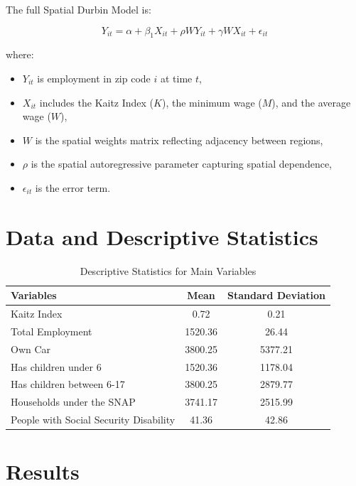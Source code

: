 \documentclass[12pt]{article}
\begin{document}
The full Spatial Durbin Model is:

\[
	Y_{it} = \alpha + \beta_1 X_{it} + \rho W Y_{it} + \gamma W X_{it} + \epsilon_{it}
\]

where:
\begin{itemize}
	\item $Y_{it}$ is employment in zip code $i$ at time $t$,
	\item $X_{it}$ includes the Kaitz Index ($K$), the minimum wage ($M$), and the average wage ($W$),
	\item $W$ is the spatial weights matrix reflecting adjacency between regions,
	\item $\rho$ is the spatial autoregressive parameter capturing spatial dependence,
	\item $\epsilon_{it}$ is the error term.
\end{itemize}

\section{Data and Descriptive Statistics}

\begin{table}[H]
	\centering
	\begin{tabular}{lcc}
		\toprule
		\textbf{Variables}                     & \textbf{Mean} & \textbf{Standard Deviation} \\
		\midrule
		Kaitz Index                            & 0.72          & 0.21                        \\
		Total Employment                       & 1520.36       & 26.44                       \\
		Own Car                                & 3800.25       & 5377.21                     \\
		Has children under 6                   & 1520.36       & 1178.04                     \\
		Has children between 6-17              & 3800.25       & 2879.77                     \\
		Households under the SNAP              & 3741.17       & 2515.99                     \\
		People with Social Security Disability & 41.36         & 42.86                       \\
		\bottomrule
	\end{tabular}
	\caption{Descriptive Statistics for Main Variables}
\end{table}

\section{Results}
\end{document}
